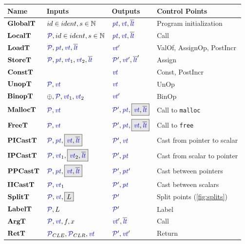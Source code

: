 \documentclass[acmsmall,review,anonymous]{acmart}\settopmatter{printfolios=true,printccs=false,printacmref=false}
\begin{document}
\begin{table}
  \begin{tabular}{|l|l|l|l|}
    \hline
    Name & Inputs & Outputs & Control Points \\
    \hline
    \(\globaltname\) & \(\globaltargstyped\) & \(\globaltres\)    & Program initialization \\
    \(\localtname\)  & \(\localtargstyped\)  & \(\localtres\)     & Call \\
    \(\loadtname\)   & \(\loadtargs\)        & \(\loadtres\)      & ValOf, AssignOp, PostIncr \\
    \(\storetname\)  & \(\storetargs\)       & \(\storetres\)     & Assign \\
    \(\consttname\)  &                       & \(\consttres\)     & Const, PostIncr \\
    \(\unoptname\)   & \(\unoptargs\)        & \(\unoptres\)      & UnOp \\
    \(\binoptname\)  & \(\binoptargs\)       & \(\binoptres\)     & BinOp \\
    \(\malloctname\) & \(\malloctargs\)      & \(\malloctres\)    & Call to {\tt malloc} \\
    \(\freetname\)   & \(\freetargs\)        & \(\freetres\)      & Call to {\tt free} \\
    \(\picasttname\) & \(\picasttargs\)      & \(\picasttres\)    & Cast from pointer to scalar \\
    \(\ipcasttname\) & \(\ipcasttargs\)      & \(\ipcasttres\)    & Cast from scalar to pointer \\
    \(\ppcasttname\) & \(\ppcasttargs\)      & \(\ppcasttres\)    & Cast between pointers \\
    \(\iicasttname\) & \(\iicasttargs\)      & \(\iicasttres\)    & Cast between scalars \\
    \(\splittname\)  & \(\splittargs\)       & \(\splittres\)     & Split points (\cref{fig:splits})\\
    \(\labeltname\)   & \(\labeltargs\)        & \(\labeltres\)      & Label \\
    \(\argtname\)    & \(\argtargs\)         & \(\argtres\)       & Call \\
    \(\rettname\)    & \(\rettargs\)         & \(\rettres\)       & Return \\
    \hline
  \end{tabular}

  \label{fig:controlpoints}
\end{table}
\end{document}
